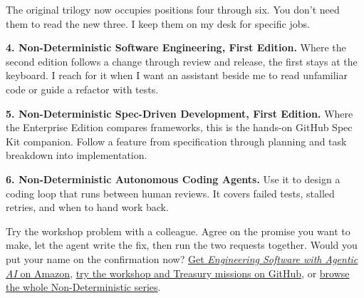 \documentclass[11pt]{article}
\begin{document}
The original trilogy now occupies positions four through six. You don't need them to read the new three. I keep them on my desk for specific jobs.

\textbf{4. Non-Deterministic Software Engineering, First Edition.} Where the second edition follows a change through review and release, the first stays at the keyboard. I reach for it when I want an assistant beside me to read unfamiliar code or guide a refactor with tests.

\textbf{5. Non-Deterministic Spec-Driven Development, First Edition.} Where the Enterprise Edition compares frameworks, this is the hands-on GitHub Spec Kit companion. Follow a feature from specification through planning and task breakdown into implementation.

\textbf{6. Non-Deterministic Autonomous Coding Agents.} Use it to design a coding loop that runs between human reviews. It covers failed tests, stalled retries, and when to hand work back.

Try the workshop problem with a colleague. Agree on the promise you want to make, let the agent write the fix, then run the two requests together. Would you put your name on the confirmation now? \href{https://www.amazon.com/dp/B0HSPH86CG}{Get \emph{Engineering Software with Agentic AI} on Amazon}, \href{https://github.com/popoloni/esa_ai}{try the workshop and Treasury missions on GitHub}, or \href{https://www.amazon.com/dp/B0GHCXPBRM}{browse the whole Non-Deterministic series}.
\end{document}
